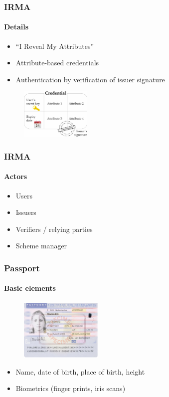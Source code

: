 \documentclass[hyperref={urlcolor=black, citecolor=black, pdfpagemode=UseNone, pdfpagelayout=SinglePage, pdfstartview=}]{beamer}
\begin{document}
\begin{frame}
  \frametitle{IRMA}
  \framesubtitle{Details}
  \begin{itemize}
    \item ``I Reveal My Attributes''
    \item Attribute-based credentials
    \item Authentication by verification of issuer signature
  \end{itemize}
  \begin{figure}[tb]
      \includegraphics[width=0.3\textwidth]{images/ABC.png}
    \end{figure}
\end{frame}

\begin{frame}
  \frametitle{IRMA}
  \framesubtitle{Actors}
  \begin{itemize}
    \item Users
    \item Issuers
    \item Verifiers / relying parties
    \item Scheme manager
  \end{itemize}
\end{frame}

\begin{frame}
  \frametitle{Passport}
  \framesubtitle{Basic elements}
  \vspace*{-0.8cm}
  \begin{figure}[tb]
    \includegraphics[width=0.35\textwidth]{images/dutchpassport.png}
  \end{figure}
  \begin{itemize}
    \item<1-> Name, date of birth, place of birth, height
    \item<2-> Biometrics (finger prints, iris scans)
  \end{itemize}
\end{frame}
\end{document}
